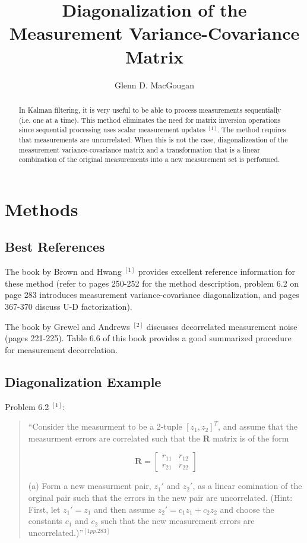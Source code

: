\documentclass[letterpaper,11pt]{article}
\title{Diagonalization of the Measurement Variance-Covariance Matrix}
\author{Glenn D. MacGougan}
\begin{document}
\maketitle

\begin{abstract}
In Kalman filtering, it is very useful to be able to process measurements sequentially (i.e. one at a time). This method eliminates the need for matrix inversion operations since sequential processing uses scalar measurement updates $^{[1]}$. The method requires that measurements are uncorrelated. When this is not the case, diagonalizeation of the measurement variance-covariance matrix and a transformation that is a linear combination of the original measurements into a new measurement set is performed.
\end{abstract}

\section{Methods}

\subsection{Best References}

The book by Brown and Hwang $^{[1]}$ provides excellent reference information for these method (refer to pages 250-252 for the method description, problem 6.2 on page 283 introduces measurement variance-covariance diagonalization, and pages 367-370 discuss U-D factorization).

The book by Grewel and Andrews $^{[2]}$ discusses decorrelated measurement noise (pages 221-225). Table 6.6 of this book provides a good summarized procedure for measurement decorrelation. 

\subsection{Diagonalization Example}
Problem 6.2 $^{[1]}$:

\begin{quote} 
``Consider the measurment to be a 2-tuple $[z_1, z_2]^T$, and assume that the measurment errors are correlated such that the \textbf{R} matrix is of the form

\begin{equation}
\textbf{R} = \left[ 
\begin{array}{cc}
r_{11} & r_{12} \\
r_{21} & r_{22} 
\end{array}
\right] 
\end{equation}

(a) Form a new measurment pair, $z_1'$ and $z_2'$, as a linear comination of the orginal pair such that the errors in the new pair are uncorrelated. (Hint: First, let $z_1'= z_1$ and then assume $z_2' = c_1 z_1 + c_2 z_2$ and choose the constants $c_1$ and $c_2$ such that the new measurement errors are uncorrelated.)''$^{[1pp. 283]}$
\end{quote}
\end{document}
